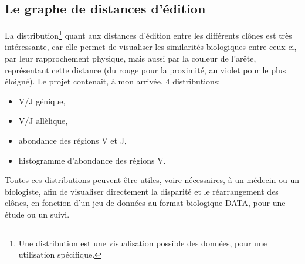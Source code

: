 \documentclass[12pt]{report}
\begin{document}
\begin{spacing}{1.2}
\chapter{Le graphe de distances d'édition}


La distribution\footnote{Une distribution est une visualisation possible des données, pour une utilisation spécifique.} quant aux distances d'édition entre les différents clônes est très intéressante, car elle permet de visualiser les similarités biologiques entre ceux-ci, par leur rapprochement physique, mais aussi par la couleur de l'arête, représentant cette distance (du rouge pour la proximité, au violet pour le plus éloigné).
\newline
Le projet contenait, à mon arrivée, 4 distributions:
\begin{itemize}
\item V/J génique,
\item V/J allèlique,
\item abondance des régions V et J,
\item histogramme d'abondance des régions V.
\end{itemize}
Toutes ces distributions peuvent être utiles, voire nécessaires, à un médecin ou un biologiste, afin de visualiser directement la disparité et le réarrangement des clônes, en fonction d'un jeu de données au format biologique DATA, pour une étude ou un suivi.


\end{spacing}
\end{document}
